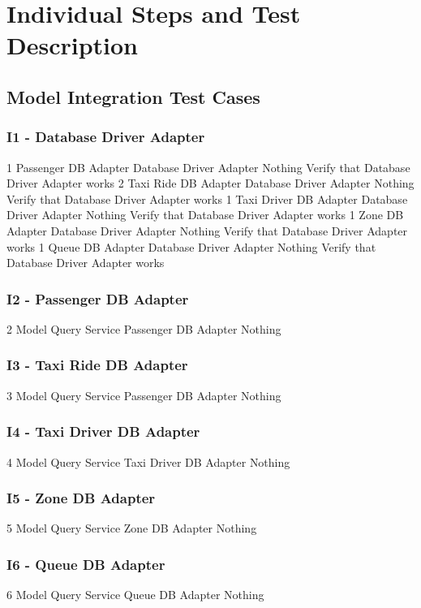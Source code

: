 \section{Individual Steps and Test Description}

\subsection{Model Integration Test Cases}
\subsubsection{I1 - Database Driver Adapter}
\testCaseSimple
	{1}
	{Passenger DB Adapter}
	{Database Driver Adapter}
	{Nothing}
	{Verify that Database Driver Adapter works}
\testCaseSimple
	{2}
	{Taxi Ride DB Adapter}
	{Database Driver Adapter}
	{Nothing}
	{Verify that Database Driver Adapter works}
\testCaseSimple
	{1}
	{Taxi Driver DB Adapter}
	{Database Driver Adapter}
	{Nothing}
	{Verify that Database Driver Adapter works}
\testCaseSimple
	{1}
	{Zone DB Adapter}
	{Database Driver Adapter}
	{Nothing}
	{Verify that Database Driver Adapter works}
\testCaseSimple
	{1}
	{Queue DB Adapter}
	{Database Driver Adapter}
	{Nothing}
	{Verify that Database Driver Adapter works}
\subsubsection{I2 - Passenger DB Adapter}
\testCaseSimple
	{2}
	{Model Query Service}
	{Passenger DB Adapter}
	{Nothing}
	{}
\subsubsection{I3 - Taxi Ride DB Adapter}
\testCaseSimple
	{3}
	{Model Query Service}
	{Passenger DB Adapter}
	{Nothing}
	{}
\subsubsection{I4 - Taxi Driver DB Adapter}
\testCaseSimple
	{4}
	{Model Query Service}
	{Taxi Driver DB Adapter}
	{Nothing}
	{}
\subsubsection{I5 - Zone DB Adapter}
\testCaseSimple
	{5}
	{Model Query Service}
	{Zone DB Adapter}
	{Nothing}
	{}
\subsubsection{I6 - Queue DB Adapter}
\testCaseSimple
	{6}
	{Model Query Service}
	{Queue DB Adapter}
	{Nothing}
	{}
